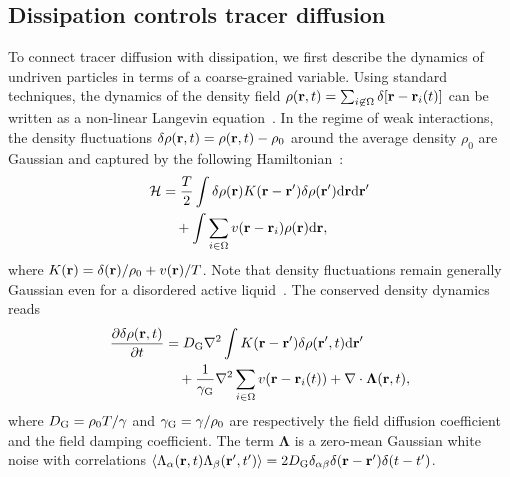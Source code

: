 \documentclass[superscriptaddress, twocolumn, prx, longbibliography, nofootinbib]{revtex4-1}
\newcommand{\dd}{\text{d}}
\begin{document}


\subsection{Dissipation controls tracer diffusion}\label{sec:diff}

To connect tracer diffusion with dissipation, we first describe the dynamics of undriven particles in terms of a coarse-grained variable. Using standard techniques, the dynamics of the density field $\rho({\bf r},t) = \sum_{i\not\in\Omega}\delta[{\bf r}-{\bf r}_i(t)]$ can be written as a non-linear Langevin equation~\cite{Dean1996}. In the regime of weak interactions, the density fluctuations $\delta \rho({\bf r},t ) = \rho({\bf r}, t) - \rho_0$ around the average density $\rho_0$ are Gaussian and captured by the following Hamiltonian~\cite{Chandler1993, Demery2014, Kruger2017}:
\begin{equation}
	\begin{aligned}
		{\cal H} &= \frac{T}{2} \int \delta \rho ({\bf r}) K({\bf r} - {\bf r}') \delta \rho ({\bf r}') \dd{\bf r}\dd{\bf r}'
		\\
		&\quad + \int \sum_{i\in\Omega} v({\bf r}-{\bf r}_i) \rho({\bf r}) \dd{\bf r} ,
	\end{aligned}
\end{equation}
where $K({\bf r})= \delta({\bf r})/\rho_0 + v({\bf r})/T$. Note that density fluctuations remain generally Gaussian even for a disordered active liquid~\cite{Fily2012}. The conserved density dynamics reads
\begin{equation}\label{eq:EvolutionField}
	\begin{aligned}
		\frac{\partial \delta \rho({\bf r}, t)}{\partial t} &= D_{\rm G} \nabla^2 \int K({\bf r}-{\bf r}') \delta \rho({\bf r}', t) \dd{\bf r}'
		\\
		&\quad + \frac{1}{\gamma_{\rm G}} \nabla^2 \sum_{i\in\Omega}v({\bf r}-{\bf r}_i(t)) + \nabla \cdot {\boldsymbol\Lambda}({\bf r},t) ,
	\end{aligned}
\end{equation}
where $D_{\rm G} = \rho_0 T/\gamma$ and $\gamma_{\rm G}=\gamma/\rho_0$ are respectively the field diffusion coefficient and the field damping coefficient. The term $\boldsymbol\Lambda$ is a zero-mean Gaussian white noise with correlations $\langle \Lambda_\alpha({\bf r}, t) \Lambda_\beta({\bf r}', t') \rangle = 2 D_{\rm G} \delta_{\alpha\beta}\delta({\bf r} - {\bf r}')\delta(t-t')$.
\end{document}

